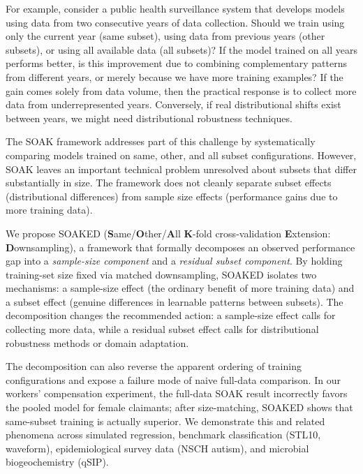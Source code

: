 \documentclass{article}
\begin{document}
For example, consider a public health surveillance system that develops models using data from two consecutive years of data collection.
Should we train using only the current year (same subset), using data from previous years (other subsets), or using all available data (all subsets)? 
If the model trained on all years performs better, is this improvement due to combining complementary patterns from different years, or merely because we have more training examples? 
If the gain comes solely from data volume, then the practical response is to collect more data from underrepresented years. 
Conversely, if real distributional shifts exist between years, we might need distributional robustness techniques.

The SOAK framework \citep{hocking2026} addresses part of this challenge by systematically comparing models trained on same, other, and all subset configurations.
However, SOAK leaves an important technical problem unresolved about subsets that differ substantially in size.
The framework does not cleanly separate subset effects (distributional differences) from sample size effects (performance gains due to more training data).

We propose SOAKED (\textbf{S}ame/\textbf{O}ther/\textbf{A}ll \textbf{K}-fold cross-validation \textbf{E}xtension: \textbf{D}ownsampling), a framework that formally decomposes an observed performance gap into a \emph{sample-size component} and a \emph{residual subset component}.
By holding training-set size fixed via matched downsampling, SOAKED isolates two mechanisms: a sample-size effect (the ordinary benefit of more training data) and a subset effect (genuine differences in learnable patterns between subsets).
The decomposition changes the recommended action: a sample-size effect calls for collecting more data, while a residual subset effect calls for distributional robustness methods or domain adaptation.

The decomposition can also reverse the apparent ordering of training configurations and expose a failure mode of naive full-data comparison.
In our workers' compensation experiment, the full-data SOAK result incorrectly favors the pooled model for female claimants; after size-matching, SOAKED shows that same-subset training is actually superior.
We demonstrate this and related phenomena across simulated regression, benchmark classification (STL10, waveform), epidemiological survey data (NSCH autism), and microbial biogeochemistry (qSIP).
\end{document}
